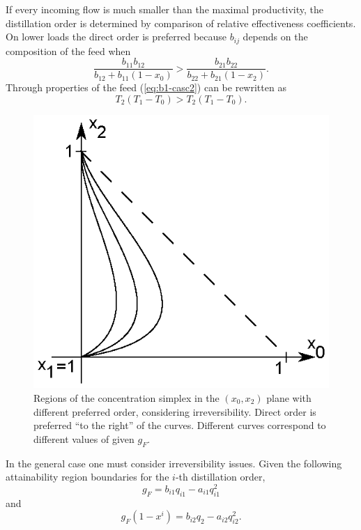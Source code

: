 \documentclass[12pt]{article}
\begin{document}
If every incoming flow is much smaller than the maximal productivity, the distillation order is determined by comparison of relative effectiveness coefficients. On lower loads the direct order is preferred because $b_{ij}$ depends on the composition of the feed when
\begin{equation}
\frac{b_{11}b_{12}}{b_{12}+b_{11}(1-x_0)}>\frac{b_{21}b_{22}}{b_{22}+b_{21}(1-x_2)}.
\label{eq:b1-casc2}
\end{equation}
Through properties of the feed (\ref{eq:b1-casc2}) can be rewritten as
\begin{equation}
T_2(T_1 - T_0) > T_2(T_1 - T_0).
\label{eq:b1-sc2}
\end{equation}

\begin{figure}[bth]
\centering
\includegraphics{simplex.eps}
\caption{Regions of the concentration simplex in the $(x_0,x_2)$ plane with different preferred order, considering irreversibility. Direct order is preferred ``to the right'' of the curves. Different curves correspond to different values of given $g_F$.}
\label{fig:pic5}
\end{figure}

In the general case one must consider irreversibility issues. Given the following attainability region boundaries for the $i$-th distillation order,
\begin{equation}
g_F = b_{i1} q_{i1} - a_{i1} q_{i1}^2
\label{eq:1c}
\end{equation}
and
\begin{equation}
g_F (1-x^i) = b_{i2} q_2 - a_{i2} q_{i2}^2.
\label{eq:2c}
\end{equation}
\end{document}
